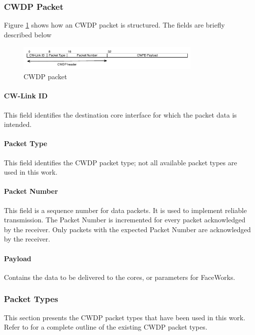 \documentclass[conference]{IEEEtran}
\begin{document}
\subsubsection{CWDP Packet}

Figure \ref{fig:cwdp-packet} shows how an CWDP packet is structured. The fields are briefly described below

\begin{figure}[h]
  \centering
      \includegraphics[width=9cm,height=1.25cm]{Diagrams/CWDP-Packet.pdf}
  \caption{CWDP packet}\label{fig:cwdp-packet}
\end{figure}

\paragraph*{CW-Link ID} This field identifies the destination core interface for which the packet data is intended.
\paragraph*{Packet Type} This field identifies the CWDP packet type; not all available packet types are used in this work.
\paragraph*{Packet Number} This field is a sequence number for data packets. It is used to implement reliable transmission. The Packet Number is incremented for every packet acknowledged by the receiver. Only packets with the expected Packet Number are acknowledged by the receiver.
\paragraph*{Payload} Contains the data to be delivered to the cores, or parameters for FaceWorks.


\subsubsection{Packet Types}

This section presents the CWDP packet types that have been used in this work. Refer to \cite{Facedata} for a complete outline of the existing CWDP packet types.

\end{document}
